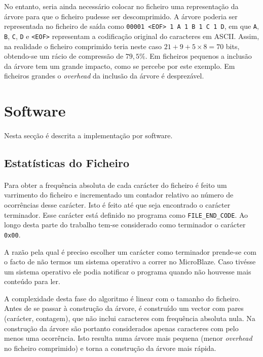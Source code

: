 \documentclass[a4paper]{article}
\begin{document}
	No entanto, seria ainda necessário colocar no ficheiro uma representação da árvore para que o ficheiro pudesse ser descomprimido. A árvore poderia ser representada no ficheiro de saída como \texttt{00001 <EOF> 1 A 1 B 1 C 1 D}, em que \texttt{A}, \texttt{B}, \texttt{C}, \texttt{D} e \texttt{<EOF>} representam a codificação original do caracteres em ASCII. Assim, na realidade o ficheiro comprimido teria neste caso $21 + 9 + 5 \times 8 = 70$ bits, obtendo-se um rácio de compressão de $79,5\%$. Em ficheiros pequenos a inclusão da árvore tem um grande impacto, como se percebe por este exemplo. Em ficheiros grandes o \textit{overhead} da inclusão da árvore é desprezável.

	\section{Software}

	\paragraph{} Nesta secção é descrita a implementação por software.

	\subsection{Estatísticas do Ficheiro}

	\paragraph{} Para obter a frequência absoluta de cada carácter do ficheiro é feito um varrimento do ficheiro e incrementado um contador relativo ao número de ocorrências desse carácter. Isto é feito até que seja encontrado o carácter terminador. Esse carácter está definido no programa como \texttt{FILE\_END\_CODE}. Ao longo desta parte do trabalho tem-se considerado como terminador o carácter \texttt{0x00}.

	A razão pela qual é preciso escolher um carácter como terminador prende-se com o facto de não termos um sistema operativo a correr no MicroBlaze. Caso tivésse um sistema operativo ele podia notificar o programa quando não houvesse mais conteúdo para ler.

	A complexidade desta fase do algoritmo é linear com o tamanho do ficheiro. Antes de se passar à construção da árvore, é construído um vector com pares (carácter, contagem), que não inclui caracteres com frequência absoluta nula. Na construção da árvore são portanto considerados apenas caracteres com pelo menos uma ocorrência. Isto resulta numa árvore mais pequena (menor \textit{overhead} no ficheiro comprimido) e torna a construção da árvore mais rápida.
\end{document}
